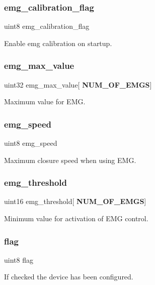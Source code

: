 \subsubsection{emg\+\_\+calibration\+\_\+flag}
{\footnotesize\ttfamily uint8 emg\+\_\+calibration\+\_\+flag}

Enable emg calibration on startup. \mbox{\label{structst__mem_aeb71cf2bff2584abb616d4b5dcc4c4af}} 
\subsubsection{emg\+\_\+max\+\_\+value}
{\footnotesize\ttfamily uint32 emg\+\_\+max\+\_\+value[\textbf{ N\+U\+M\+\_\+\+O\+F\+\_\+\+E\+M\+GS}]}

Maximum value for E\+MG. \mbox{\label{structst__mem_ae8e800591064bf14eb2dd3a3fb2c325b}} 
\subsubsection{emg\+\_\+speed}
{\footnotesize\ttfamily uint8 emg\+\_\+speed}

Maximum closure speed when using E\+MG. \mbox{\label{structst__mem_aaeb84b2fd1a137ee9234fd3c24c97aaa}} 
\subsubsection{emg\+\_\+threshold}
{\footnotesize\ttfamily uint16 emg\+\_\+threshold[\textbf{ N\+U\+M\+\_\+\+O\+F\+\_\+\+E\+M\+GS}]}

Minimum value for activation of E\+MG control. \mbox{\label{structst__mem_af11e40d15a1361229a78e772af5b3c94}} 
\subsubsection{flag}
{\footnotesize\ttfamily uint8 flag}

If checked the device has been configured. \mbox{\label{structst__mem_a492bfda30c3852a68b2cbfba9531e3d1}} 
